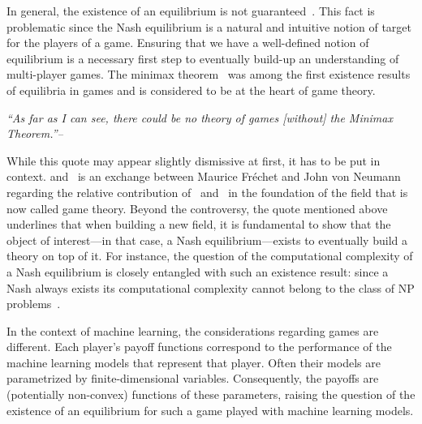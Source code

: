 In general, the existence of an equilibrium is not guaranteed~\citep{von1944theory}. This fact is problematic since the Nash equilibrium is a natural and intuitive notion of target for the players of a game. Ensuring that we have a well-defined notion of equilibrium is a necessary first step to eventually build-up an understanding of multi-player games. The minimax theorem~\citep{neumann1928theorie} was among the first existence results of equilibria in games and is considered to be at the heart of game theory.\\ 

\begin{center}
\begin{minipage}{.7 \textwidth}
\emph{``As far as I can see, there could be no theory of games [without] the Minimax Theorem.''--~\citet{von1953communication}\\
}
\end{minipage}
\end{center} 
While this quote may appear slightly dismissive at first, it has to be put in context. \citet{von1953communication} and~\citet{frechet1953commentary} is an exchange between Maurice Fréchet and John von Neumann regarding the relative contribution of~\citet{borel1921theorie} and~\citet{neumann1928theorie} in the foundation of the field that is now called game theory. Beyond the controversy, the quote mentioned above underlines that when building a new field, it is fundamental to show that the object of interest---in that case, a Nash equilibrium---exists to eventually build a theory on top of it. For instance, the question of the computational complexity of a Nash equilibrium is closely entangled with such an existence result: since a Nash always exists its computational complexity cannot belong to the class of NP problems~\citep{papadimitriou2007complexity}.



In the context of machine learning, the considerations regarding games are different. Each player's payoff functions correspond to the performance of the machine learning models that represent that player. Often their models are parametrized by finite-dimensional variables. Consequently, the payoffs are (potentially non-convex) functions of these parameters, raising the question of the existence of an equilibrium for such a game played with machine learning models.


